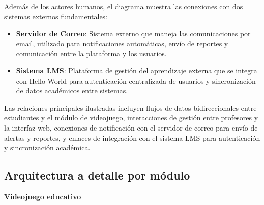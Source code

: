 Además de los actores humanos, el diagrama muestra las conexiones con dos sistemas externos fundamentales:

\begin{itemize}
	\item \textbf{Servidor de Correo}: Sistema externo que maneja las comunicaciones por email, utilizado para notificaciones automáticas, envío de reportes y comunicación entre la plataforma y los usuarios.
	\item \textbf{Sistema LMS}: Plataforma de gestión del aprendizaje externa que se integra con Hello World para autenticación centralizada de usuarios y sincronización de datos académicos entre sistemas.
\end{itemize}

Las relaciones principales ilustradas incluyen flujos de datos bidireccionales entre estudiantes y el módulo de videojuego, interacciones de gestión entre profesores y la interfaz web, conexiones de notificación con el servidor de correo para envío de alertas y reportes, y enlaces de integración con el sistema LMS para autenticación y sincronización académica.

\subsection{Arquitectura a detalle por módulo}


\textbf{Videojuego educativo}

%
%

